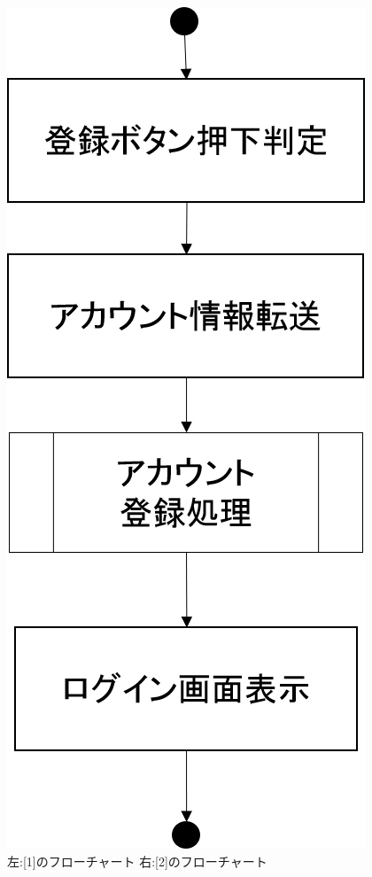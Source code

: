 \begin{figure}[htbp]
\begin{minipage}{0.5\hsize}
\begin{center}
   \includegraphics[width=1\linewidth,clip]{./img/create_account/sub2.png}
  \end{center}
 \end{minipage}
 \caption{左:[1]のフローチャート 右:[2]のフローチャート}\label{fig:createaccountflow0}
\end{figure}

